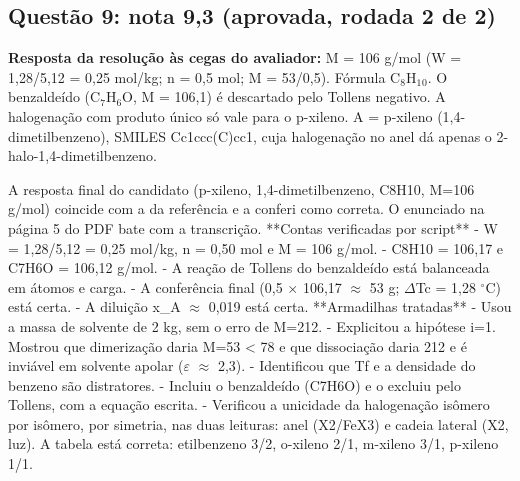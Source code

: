 \documentclass{article}%
\begin{document}
\subsection*{Questão 9: nota 9,3 (aprovada, rodada 2 de 2)}%
\textbf{Resposta da resolução às cegas do avaliador:} M = 106 g/mol (W = 1,28/5,12 = 0,25 mol/kg; n = 0,5 mol; M = 53/0,5). Fórmula C$_{8}$H$_{1}$$_{0}$. O benzaldeído (C$_{7}$H$_{6}$O, M = 106,1) é descartado pelo Tollens negativo. A halogenação com produto único só vale para o p{-}xileno. A = p{-}xileno (1,4{-}dimetilbenzeno), SMILES Cc1ccc(C)cc1, cuja halogenação no anel dá apenas o 2{-}halo{-}1,4{-}dimetilbenzeno.\par %
A resposta final do candidato (p{-}xileno, 1,4{-}dimetilbenzeno, C8H10, M=106 g/mol) coincide com a da referência e a conferi como correta. O enunciado na página 5 do PDF bate com a transcrição.\newline%
\newline%
**Contas verificadas por script**\newline%
{-} W = 1,28/5,12 = 0,25 mol/kg, n = 0,50 mol e M = 106 g/mol.\newline%
{-} C8H10 = 106,17 e C7H6O = 106,12 g/mol.\newline%
{-} A reação de Tollens do benzaldeído está balanceada em átomos e carga.\newline%
{-} A conferência final (0,5 $\times$ 106,17 $\approx$ 53 g; $\Delta$Tc = 1,28 $^\circ$C) está certa.\newline%
{-} A diluição x\_A $\approx$ 0,019 está certa.\newline%
\newline%
**Armadilhas tratadas**\newline%
{-} Usou a massa de solvente de 2 kg, sem o erro de M=212.\newline%
{-} Explicitou a hipótese i=1. Mostrou que dimerização daria M=53 < 78 e que dissociação daria 212 e é inviável em solvente apolar ($\varepsilon$ $\approx$ 2,3).\newline%
{-} Identificou que Tf e a densidade do benzeno são distratores.\newline%
{-} Incluiu o benzaldeído (C7H6O) e o excluiu pelo Tollens, com a equação escrita.\newline%
{-} Verificou a unicidade da halogenação isômero por isômero, por simetria, nas duas leituras: anel (X2/FeX3) e cadeia lateral (X2, luz). A tabela está correta: etilbenzeno 3/2, o{-}xileno 2/1, m{-}xileno 3/1, p{-}xileno 1/1.\newline%
$$
\end{document}
